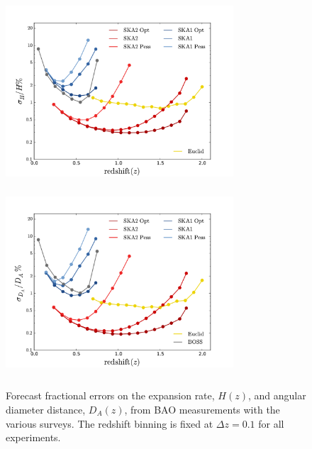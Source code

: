 \documentclass[useAMS,usenatbib]{mn2e}
\begin{document}
\begin{figure}
\begin{center}
\includegraphics[height=7cm,width=8.5cm]{plots/output_lnH_mario_bias_corrected_nz_2.pdf}
\includegraphics[height=7cm,width=8.5cm]{plots/output_lnda_mario_bias_added_Euclid.pdf}
\caption{Forecast fractional errors on the expansion rate, $H(z)$, and angular diameter distance, $D_A(z)$, from BAO measurements with the various surveys. The redshift binning is fixed at $\Delta z = 0.1$ for all experiments.}
\label{fig:fraction}
\end{center}
\end{figure}
\end{document}
